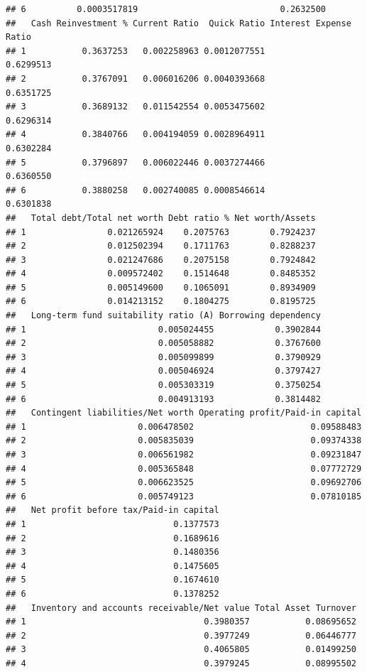 \documentclass[
]{book}
\begin{document}
\begin{verbatim}
## 6          0.0003517819                            0.2632500
##   Cash Reinvestment % Current Ratio  Quick Ratio Interest Expense Ratio
## 1           0.3637253   0.002258963 0.0012077551              0.6299513
## 2           0.3767091   0.006016206 0.0040393668              0.6351725
## 3           0.3689132   0.011542554 0.0053475602              0.6296314
## 4           0.3840766   0.004194059 0.0028964911              0.6302284
## 5           0.3796897   0.006022446 0.0037274466              0.6360550
## 6           0.3880258   0.002740085 0.0008546614              0.6301838
##   Total debt/Total net worth Debt ratio % Net worth/Assets
## 1                0.021265924    0.2075763        0.7924237
## 2                0.012502394    0.1711763        0.8288237
## 3                0.021247686    0.2075158        0.7924842
## 4                0.009572402    0.1514648        0.8485352
## 5                0.005149600    0.1065091        0.8934909
## 6                0.014213152    0.1804275        0.8195725
##   Long-term fund suitability ratio (A) Borrowing dependency
## 1                          0.005024455            0.3902844
## 2                          0.005058882            0.3767600
## 3                          0.005099899            0.3790929
## 4                          0.005046924            0.3797427
## 5                          0.005303319            0.3750254
## 6                          0.004913193            0.3814482
##   Contingent liabilities/Net worth Operating profit/Paid-in capital
## 1                      0.006478502                       0.09588483
## 2                      0.005835039                       0.09374338
## 3                      0.006561982                       0.09231847
## 4                      0.005365848                       0.07772729
## 5                      0.006623525                       0.09692706
## 6                      0.005749123                       0.07810185
##   Net profit before tax/Paid-in capital
## 1                             0.1377573
## 2                             0.1689616
## 3                             0.1480356
## 4                             0.1475605
## 5                             0.1674610
## 6                             0.1378252
##   Inventory and accounts receivable/Net value Total Asset Turnover
## 1                                   0.3980357           0.08695652
## 2                                   0.3977249           0.06446777
## 3                                   0.4065805           0.01499250
## 4                                   0.3979245           0.08995502

\end{verbatim}
\end{document}
